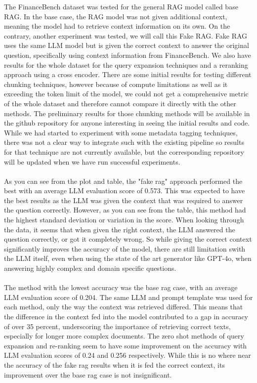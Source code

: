 \documentclass{article}
\begin{document}
   \noindent The FinanceBench dataset was tested for the general RAG model called base RAG. In the base case, the RAG model was not given additional context, meaning the model had to retrieve context information on its own. On the contrary, another experiment was tested, we will call this Fake RAG. Fake RAG uses the same LLM model but is given the correct context to answer the original question, specifically using context information from FinanceBench. We also have results for the whole dataset for the query expansion techniques and a reranking approach using a cross encoder. There are some initial results for testing different chunking techniques, however because of compute limitations as well as it exceeding the token limit of the model, we could not get a comprehensive metric of the whole dataset and therefore cannot compare it directly with the other methods. The preliminary results for those chunking methods will be available in the github repository for anyone interesting in seeing the initial results and code. While we had started to experiment with some metadata tagging techniques, there was not a clear way to integrate such with the existing pipeline so results for that technique are not currently available, but the corresponding repository will be updated when we have run successful experiments.  
\\ 
\\
   As you can see from the plot and table, the "fake rag" approach performed the best with an average LLM evaluation score of 0.573. This was expected to have the best results as the LLM was given the context that was required to answer the question correctly. However, as you can see from the table, this method had the highest standard deviation or variation in the score. When looking through the data, it seems that when given the right context, the LLM answered the question correctly, or got it completely wrong. So while giving the correct context significantly improves the accuracy of the model, there are still limitation swith the LLM itself, even when using the state of the art generator like GPT-4o, when answering highly complex and domain specific questions. 
\\
\\
   The method with the lowest accuracy was the base rag case, with an average LLM evaluation score of 0.204. The same LLM and prompt template was used for each method, only the way the context was retrieved differed. This means that the difference in the context fed into the model contributed to a gap in accuracy of over 35 percent, underscoring the importance of retrieving correct texts, especially for longer more complex documents. The zero shot methods of query expansion and re-ranking seem to have some improvement on the accuracy with LLM evaluation scores of 0.24 and 0.256 respectively. While this is no where near the accuracy of the fake rag results when it is fed the correct context, its improvement over the base rag case is not insignificant.
\end{document}
